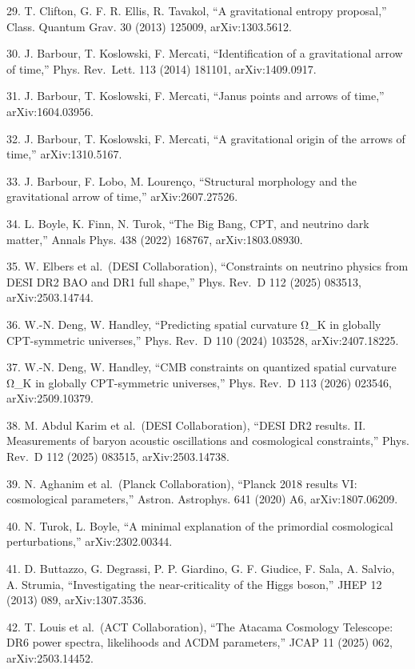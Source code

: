 \documentclass[
]{article}
\begin{document}
29. T. Clifton, G. F. R. Ellis, R. Tavakol, ``A gravitational entropy
proposal,'' Class. Quantum Grav. 30 (2013) 125009, arXiv:1303.5612.

30. J. Barbour, T. Koslowski, F. Mercati, ``Identification of a
gravitational arrow of time,'' Phys. Rev.~Lett. 113 (2014) 181101,
arXiv:1409.0917.

31. J. Barbour, T. Koslowski, F. Mercati, ``Janus points and arrows of
time,'' arXiv:1604.03956.

32. J. Barbour, T. Koslowski, F. Mercati, ``A gravitational origin of
the arrows of time,'' arXiv:1310.5167.

33. J. Barbour, F. Lobo, M. Lourenço, ``Structural morphology and the
gravitational arrow of time,'' arXiv:2607.27526.

34. L. Boyle, K. Finn, N. Turok, ``The Big Bang, CPT, and neutrino dark
matter,'' Annals Phys. 438 (2022) 168767, arXiv:1803.08930.

35. W. Elbers et al.~(DESI Collaboration), ``Constraints on neutrino
physics from DESI DR2 BAO and DR1 full shape,'' Phys. Rev.~D 112 (2025)
083513, arXiv:2503.14744.

36. W.-N. Deng, W. Handley, ``Predicting spatial curvature Ω\_K in
globally CPT-symmetric universes,'' Phys. Rev.~D 110 (2024) 103528,
arXiv:2407.18225.

37. W.-N. Deng, W. Handley, ``CMB constraints on quantized spatial
curvature Ω\_K in globally CPT-symmetric universes,'' Phys. Rev.~D 113
(2026) 023546, arXiv:2509.10379.

38. M. Abdul Karim et al.~(DESI Collaboration), ``DESI DR2 results. II.
Measurements of baryon acoustic oscillations and cosmological
constraints,'' Phys. Rev.~D 112 (2025) 083515, arXiv:2503.14738.

39. N. Aghanim et al.~(Planck Collaboration), ``Planck 2018 results VI:
cosmological parameters,'' Astron. Astrophys. 641 (2020) A6,
arXiv:1807.06209.

40. N. Turok, L. Boyle, ``A minimal explanation of the primordial
cosmological perturbations,'' arXiv:2302.00344.

41. D. Buttazzo, G. Degrassi, P. P. Giardino, G. F. Giudice, F. Sala, A.
Salvio, A. Strumia, ``Investigating the near-criticality of the Higgs
boson,'' JHEP 12 (2013) 089, arXiv:1307.3536.

42. T. Louis et al.~(ACT Collaboration), ``The Atacama Cosmology
Telescope: DR6 power spectra, likelihoods and ΛCDM parameters,'' JCAP 11
(2025) 062, arXiv:2503.14452.
\end{document}

